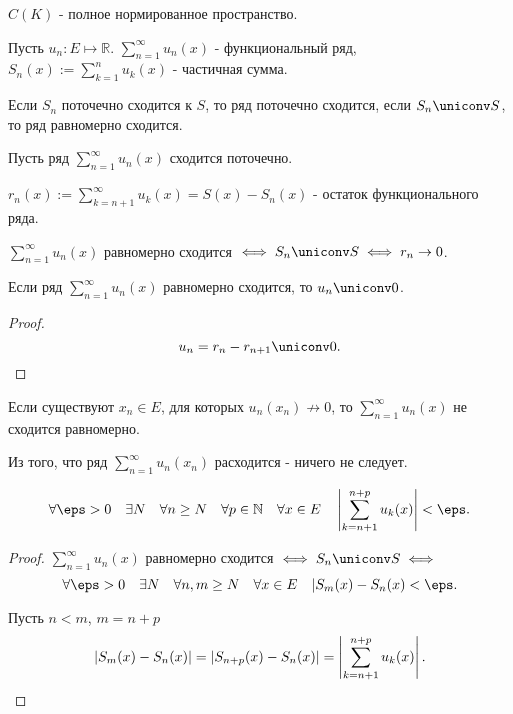 \begin{consequence} \thmslashn

    $C(K)$ - полное нормированное пространство.
\end{consequence}
\begin{definition} \thmslashn 

    Пусть $u_{n} : E \mapsto \mathbb{R}$.
    $\sum\limits_{n=1}^{\infty} u_{n}(x)$ - функциональный ряд, $S_{n}(x) := \sum\limits_{k=1}^{n} u_{k}(x)$ - частичная сумма.

    Если $S_{n}$ поточечно сходится к $S$, то ряд поточечно сходится, если $S_{n} \uniconv S$, то ряд равномерно сходится.
\end{definition}
\begin{definition} \thmslashn 

    Пусть ряд $\sum\limits_{n=1}^{\infty} u_{n}(x)$ сходится поточечно.

    $r_{n}(x) := \sum\limits_{k=n+1}^{\infty} u_{k}(x) = S(x) - S_{n}(x)$ - остаток функционального ряда.
\end{definition}
\begin{theorem} \thmslashn

    $\sum\limits_{n=1}^{\infty} u_{n}(x)$ равномерно сходится $\iff S_{n} \uniconv S \iff r_{n} \to 0$.
\end{theorem}
\begin{consequence} \thmslashn

    Если ряд $\sum\limits_{n=1}^{\infty} u_{n}(x)$ равномерно сходится, то $u_{n} \uniconv 0$.
    \begin{proof} \thmslashn
    
        \[ u_{n} = r_{n} - r_{n+1} \uniconv 0.\qedhere\] 
    \end{proof}
\end{consequence}
\begin{remark} \thmslashn

    Если существуют $x_{n}\in E$, для которых $u_{n}(x_{n}) \not\to 0$, то $\sum\limits_{n=1}^{\infty} u_{n}(x)$ не сходится равномерно.

    Из того, что ряд $\sum\limits_{n=1}^{\infty} u_{n}(x_{n})$ расходится - ничего не следует.
\end{remark}
\begin{theorem} \thmslashn

    \[ \forall{\eps > 0}\quad \exists{N}\quad \forall{n \ge N}\quad \forall{p\in \mathbb{N}}\quad \forall{x\in E}\quad \left| \sum\limits_{k=n+1}^{n+p} u_{k}(x)\right| < \eps .\]
    \begin{proof} \thmslashn
    
        $\sum\limits_{n=1}^{\infty} u_{n}(x)$ равномерно сходится $\iff S_{n} \uniconv S \iff $ 
        \[ \forall{\eps > 0}\quad \exists{N}\quad \forall{n, m \ge N}\quad \forall{x\in E}\quad |S_{m}(x) - S_{n}(x) < \eps .\]

        Пусть $n < m$, $m = n + p$ 
        \[ |S_{m}(x) - S_{n}(x)| = |S_{n+p}(x)-S_{n}(x)| = \left| \sum\limits_{k=n+1}^{n+p} u_{k}(x)\right| .\qedhere\] 
    \end{proof}
\end{theorem}
